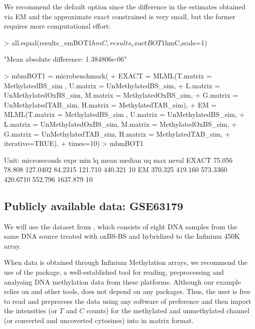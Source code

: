 \documentclass{article}
\begin{document}
We recommend the default option  since the difference in the estimates obtained via EM and the approximate exact constrained is very small, but the former requires more computational effort:

\begin{Schunk}
\begin{Sinput}
>  all.equal(results_emBOT1$hmC,results_exactBOT1$hmC,scale=1)
\end{Sinput}
\begin{Soutput}
[1] "Mean absolute difference: 1.384806e-06"
\end{Soutput}
\end{Schunk}

\begin{Schunk}
\begin{Sinput}
>  mbmBOT1 = microbenchmark(
+     EXACT = MLML(T.matrix = MethylatedBS_sim , U.matrix = UnMethylatedBS_sim,
+                  L.matrix = UnMethylatedOxBS_sim, M.matrix = MethylatedOxBS_sim,
+                  G.matrix = UnMethylatedTAB_sim, H.matrix = MethylatedTAB_sim),
+     EM =    MLML(T.matrix = MethylatedBS_sim , U.matrix = UnMethylatedBS_sim,
+                  L.matrix = UnMethylatedOxBS_sim, M.matrix = MethylatedOxBS_sim,
+                  G.matrix = UnMethylatedTAB_sim, H.matrix = MethylatedTAB_sim,
+                  iterative=TRUE),
+     times=10)
>  mbmBOT1
\end{Sinput}
\begin{Soutput}
Unit: microseconds
  expr     min      lq     mean   median      uq      max neval
 EXACT  75.056  78.808 127.0402  84.2315 121.710  440.321    10
    EM 370.325 419.160 573.3360 420.6710 552.796 1637.879    10
\end{Soutput}
\end{Schunk}


\subsection{Publicly available data: GSE63179}

We will use the dataset from \cite{10.1371/journal.pone.0118202}, which consists of eight DNA samples from the same DNA source treated with oxBS-BS and hybridized to the Infinium 450K array.

When data is obtained through Infinium Methylation arrays, we recommend the use of the  package, a well-established tool for reading, preprocessing and analysing DNA methylation data from these platforms. Although our example relies on  and other \Bioconductor{} tools,  does not depend on any packages. Thus, the user is free to read and preprocess the data using any software of preference and then import the intensities (or $T$ and $C$ counts) for the methylated and unmethylated channel (or converted and uncoverted cytosines) into \R{} in matrix format.
\end{document}
